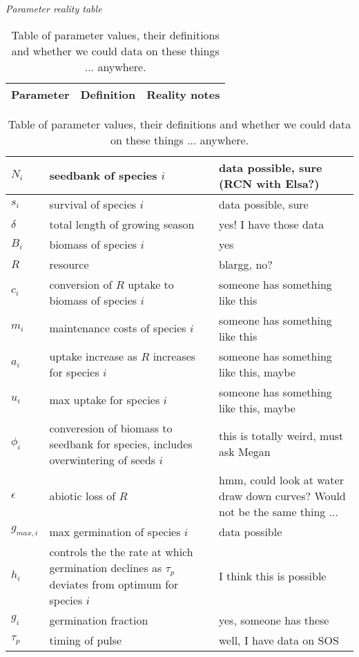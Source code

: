 \documentclass[11pt,a4paper,oneside]{article}
\begin{document}
\renewcommand{\labelitemi}{$-$}


\noindent \emph{Parameter reality table}
\begin{center}
\begin{table}[h!]
\caption{Table of parameter values, their definitions and whether we could data on these things ... anywhere.}
\begin{tabular}{ | p{3cm} | p{6cm} | p{4.0cm} |}
\hline 
Parameter & Definition & Reality notes \\ \hline 
\end{tabular}
\begin{tabular}{ | p{3.0cm} | p{6.0cm} | p{4.0cm} |}
\(N_{i}\) & seedbank of species \(i\) & data possible, sure (RCN with Elsa?) \\ \hline
\(s_{i}\) & survival of species \(i\) & data possible, sure \\ \hline
\(\delta\) & total length of growing season & yes! I have those data\\ \hline
\(B_{i}\) & biomass of species \(i\) & yes \\ \hline
\(R\) & resource & blargg, no?\\ \hline
\(c_{i}\) & conversion of \(R\) uptake to biomass of species \(i\) &  someone has something like this \\ \hline
\(m_{i}\) & maintenance costs of species \(i\) & someone has something like this \\ \hline
\(a_{i}\) & uptake increase as \(R\) increases for species \(i\) & someone has something like this, maybe\\ \hline
\(u_{i}\) & max uptake for species \(i\) & someone has something like this, maybe \\ \hline
\(\phi_{i}\) & converesion of biomass to seedbank for species, includes overwintering of seeds \(i\) & this is totally weird, must ask Megan \\ \hline
\(\epsilon\) & abiotic loss of \(R\) & hmm, could look at water draw down curves? Would not be the same thing ... \\ \hline
\(g_{max,i}\) & max germination of species \(i\) & data possible \\ \hline
\(h_{i}\) &  controls the the rate at which germination declines as \(\tau_{p}\) deviates from optimum for species \(i\)  & I think this is possible \\ \hline
\(g_{i}\) & germination fraction & yes, someone has these \\ \hline
\(\tau_{p}\) & timing of pulse & well, I have data on SOS \\ \hline

\end{tabular}
\end{table}
\end{center}
\end{document}
